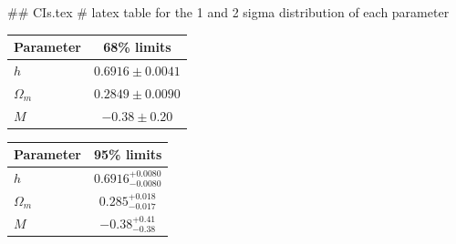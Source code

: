 ## CIs.tex
# latex table for the 1 and 2 sigma distribution of each parameter

\begin{tabular} { l  c}
 Parameter &  68\% limits\\
\hline
{\boldmath$h              $} & $0.6916\pm 0.0041          $\\
{\boldmath$\Omega_m       $} & $0.2849\pm 0.0090          $\\
{\boldmath$M              $} & $-0.38\pm 0.20             $\\
\hline
\end{tabular}

\begin{tabular} { l  c}
 Parameter &  95\% limits\\
\hline
{\boldmath$h              $} & $0.6916^{+0.0080}_{-0.0080}$\\
{\boldmath$\Omega_m       $} & $0.285^{+0.018}_{-0.017}   $\\
{\boldmath$M              $} & $-0.38^{+0.41}_{-0.38}     $\\
\hline
\end{tabular}

